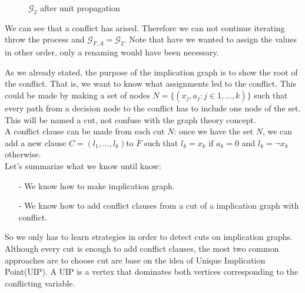 \begin{example}
\begin{figure}[H]
  \centering
  \caption{$\mathcal{G}_2$ after unit propagation}
\end{figure} 
We can see that a conflict has arised. Therefore we can not continue iterating throw the process and $\mathcal{G}_{F,A} = \mathcal{G}_2$. Note that have we wanted to assign the values in other order, only a renaming would have been necessary. 
\end{example} 
As we already stated, the purpose of the implication graph is to show the root of the conflict. That is, we want to know what assignments led to the conflict. This could be made by making a set of nodes $N=\{(x_j,a_j: j\in 1,...,k)\}$ such that every path from a decision node to the conflict has to include one node of the set. This will be named a cut, not confuse with the graph theory concept.\\


A conflict clause can be made from each cut $N$: once we have the set $N$, we can add a new clause $C = (l_1,...,l_k)$to $F$ such that $l_k = x_k$ if $a_k = 0$ and $l_k=\neg x_k$ otherwise.\\

Let's summarize what we know until know:
\begin{itemize}
\item[-] We know how to make implication graph.
\item[-] We know how to add conflict clauses from a cut of a implication graph with conflict.  
\end{itemize}

So we only has to learn strategies in order to detect cuts on implication graphs. Although every cut is enough to add conflict clauses, the most two common approaches are to choose cut are base on the idea of Unique Implication Point(UIP).  A UIP   is   a   vertex    that   dominates   both   vertices   corresponding   to   the   conflicting   variable. 

